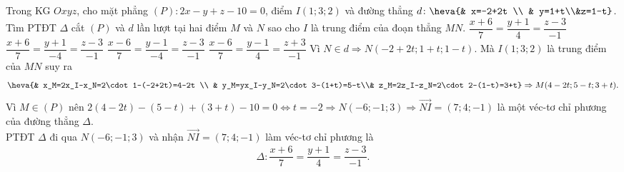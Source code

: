 \begin{ex}%
	Trong KG $Oxyz$, cho mặt phẳng $(P)\colon 2x-y+z-10=0$, điểm $I(1;3;2)$ và đường thẳng $d\colon \heva{& x=-2+2t \\ & y=1+t\\&z=1-t}$. Tìm PTĐT $\Delta$ cắt $(P)$ và $d$ lần lượt tại hai điểm $M$ và $N$ sao cho $I$ là trung điểm của đoạn thẳng $MN$.
	\choice
	{\True $\dfrac{x+6}{7}=\dfrac{y+1}{4}=\dfrac{z-3}{-1}$}
	{$\dfrac{x+6}{7}=\dfrac{y+1}{-4}=\dfrac{z-3}{-1}$}
	{$\dfrac{x-6}{7}=\dfrac{y-1}{-4}=\dfrac{z-3}{-1}$}
	{$\dfrac{x-6}{7}=\dfrac{y-1}{4}=\dfrac{z+3}{-1}$}
	\loigiai
	{
		Vì $N\in d\Rightarrow N(-2+2t;1+t;1-t)$. Mà $I(1;3;2)$ là trung điểm của $MN$ suy ra
		\begin{align*}
			\heva{& x_M=2x_I-x_N=2\cdot 1-(-2+2t)=4-2t \\ & y_M=yx_I-y_N=2\cdot 3-(1+t)=5-t\\& z_M=2z_I-z_N=2\cdot 2-(1-t)=3+t}\Rightarrow M(4-2t;5-t;3+t).
		\end{align*}
		Vì $M\in (P)$ nên $2(4-2t)-(5-t)+(3+t)-10=0\Leftrightarrow t=-2\Rightarrow N(-6;-1;3)\Rightarrow \overrightarrow{NI}=(7;4;-1)$ là một véc-tơ chỉ phương của đường thẳng $\Delta$.\\
		PTĐT $\Delta$ đi qua $N(-6;-1;3)$ và nhận $\overrightarrow{NI}=(7;4;-1)$ làm véc-tơ chỉ phương là
		\begin{align*}
			\Delta \colon \dfrac{x+6}{7}=\dfrac{y+1}{4}=\dfrac{z-3}{-1}.
		\end{align*}
	}
\end{ex}

